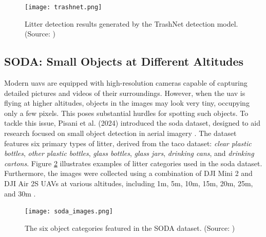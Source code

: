 \begin{figure}[!htbp]
    \centering
    \texttt{[image: trashnet.png]}
    \caption{Litter detection results generated by the TrashNet detection model. (Source: \cite{trashnet})}
    \label{fig:trashnet}
\end{figure}

\subsection{SODA: Small Objects at Different Altitudes}
\label{subsec:3_sodadataset}

Modern \glspl{uav} are equipped with high-resolution cameras capable of capturing detailed pictures and videos of their surroundings. However, when the \gls{uav} is flying at higher altitudes, objects in the images may look very tiny, occupying only a few pixels. This poses substantial hurdles for spotting such objects. To tackle this issue, Pisani et al. (2024) introduced the \gls{soda} dataset, designed to aid research focused on small object detection in aerial imagery \cite{soda_dataset}. The dataset features six primary types of litter, derived from the \gls{taco} dataset: \textit{clear plastic bottles}, \textit{other plastic bottles}, \textit{glass bottles}, \textit{glass jars}, \textit{drinking cans}, and \textit{drinking cartons}. Figure \ref{fig:soda1} illustrates examples of litter categories used in the \gls{soda} dataset. Furthermore, the images were collected using a combination of DJI Mini 2 and DJI Air 2S UAVs at various altitudes, including 1m, 5m, 10m, 15m, 20m, 25m, and 30m \cite{soda_dataset, detect_litter}.

\begin{figure}[!htbp]
    \centering
    \texttt{[image: soda\_images.png]}
    \caption{The six object categories featured in the SODA dataset. (Source: \cite{soda_dataset})}
    \label{fig:soda1}
\end{figure}


